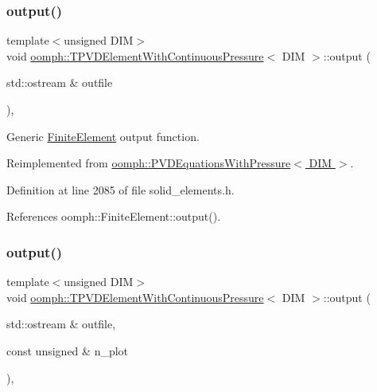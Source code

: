 \subsubsection{\texorpdfstring{output()}{output()}\hspace{0.1cm}{\footnotesize\ttfamily [1/4]}}
{\footnotesize\ttfamily template$<$unsigned D\+IM$>$ \\
void \hyperlink{classoomph_1_1TPVDElementWithContinuousPressure}{oomph\+::\+T\+P\+V\+D\+Element\+With\+Continuous\+Pressure}$<$ D\+IM $>$\+::output (\begin{DoxyParamCaption}\item[{std\+::ostream \&}]{outfile }\end{DoxyParamCaption})\hspace{0.3cm}{\ttfamily [inline]}, {\ttfamily [virtual]}}



Generic \hyperlink{classoomph_1_1FiniteElement}{Finite\+Element} output function. 



Reimplemented from \hyperlink{classoomph_1_1PVDEquationsWithPressure_a1853eace3f079f90cc34df8029bd3dba}{oomph\+::\+P\+V\+D\+Equations\+With\+Pressure$<$ D\+I\+M $>$}.



Definition at line 2085 of file solid\+\_\+elements.\+h.



References oomph\+::\+Finite\+Element\+::output().

\mbox{\label{classoomph_1_1TPVDElementWithContinuousPressure_aefeba130e3533f5af5286830d271028d}} 
\subsubsection{\texorpdfstring{output()}{output()}\hspace{0.1cm}{\footnotesize\ttfamily [2/4]}}
{\footnotesize\ttfamily template$<$unsigned D\+IM$>$ \\
void \hyperlink{classoomph_1_1TPVDElementWithContinuousPressure}{oomph\+::\+T\+P\+V\+D\+Element\+With\+Continuous\+Pressure}$<$ D\+IM $>$\+::output (\begin{DoxyParamCaption}\item[{std\+::ostream \&}]{outfile,  }\item[{const unsigned \&}]{n\+\_\+plot }\end{DoxyParamCaption})\hspace{0.3cm}{\ttfamily [inline]}, {\ttfamily [virtual]}}



